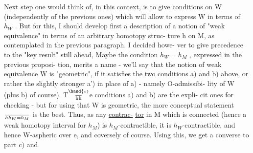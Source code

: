 Next step one would think of, in this context, is to give conditions
on W (independently of the previous ones) which will allow to express
W in terms of $h_W$ . But for this, I should develop first a description
of a notion of "weak equivalence" in terms of an arbitrary homotopy struc-%
ture h on M, as contemplated in the previous paragraph\hand{(*)}. I decided howe-%
ver to give precedence to the "key result" still ahead, 
 Maybe the condition $h_W = h_M$ , expressed in the previous proposi-%
tion, merits a name - we'll say that the notion of weak equivalence W
is "\uline{geometric}", if it satisfies the two conditions a) and b) above,
or rather the slightly stronger a') in place of a) - namely O-admissibi-%
lity of W (plus b) of course). T$\overset{\hand{\scriptscriptstyle\circ}}{\over{\mathrm h}{\mathrm h}}$e conditions a) and b) are the expli-%
cit ones for checking - but for using that W is geometric, the
more conceptual statement $\over{h}{h}_W = h_M$  is the best. Thus, as any \uline{contrac-}%
\margin{$\times$}
\uline{tor} in M which is connected (hence a weak homotopy interval for $h_M$) is
$h_M$-contractible, it is $h_W$-contractible, and hence W-aspheric over e,
and coversely of course. Using this, we get a converse to part c) and

